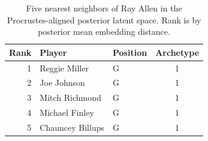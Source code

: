 \begin{table}[htbp]
  \centering\small
  \begin{tabular}{rllc}
    \toprule
    Rank & Player & Position & Archetype \\
    \midrule
    1 & Reggie Miller & G & 1 \\
    2 & Joe Johnson & G & 1 \\
    3 & Mitch Richmond & G & 1 \\
    4 & Michael Finley & G & 1 \\
    5 & Chauncey Billups & G & 1 \\
    \bottomrule
  \end{tabular}
  \caption{Five nearest neighbors of Ray Allen in the Procrustes-aligned posterior latent space. Rank is by posterior mean embedding distance.}
  \label{tab:Ray_Allen_neighbors}
\end{table}


